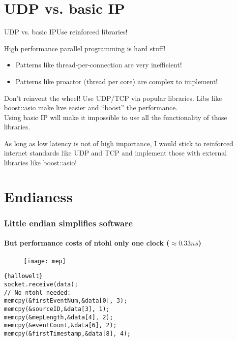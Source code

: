 \section{UDP vs. basic IP}

\begin{frame}{UDP vs. basic IP}{Use reinforced libraries!}
	\begin{alertblock}{High performance parallel programming is hard stuff!}
		\begin{itemize}
		  \item Patterns like thread-per-connection are very inefficient!
		  \item Patterns like proactor (thread per core) are complex to implement!
		\end{itemize}
	\end{alertblock}

	
	\begin{block}{Don't reinvent the wheel! Use UDP/TCP via popular libraries.}
		Libs like boost::asio make live easier and ``boost'' the performance.
		\\
		Using basic IP will make it impossible to use all the functionality of those
		libraries.
	\end{block}
	
	\begin{ergo}
		As long as low latency is not of high importance, I would stick to reinforced
		internet standards like UDP and TCP and implement those with external
		libraries like boost::asio!
	\end{ergo}
\end{frame}

\section{Endianess}

\begin{frame}[fragile]
\frametitle{Little endian simplifies software}
\framesubtitle{But performance costs of ntohl only one clock ($\approx0.33 ns$)}
	\begin{figure}[htp]
		\begin{center}
		  \texttt{[image: mep]}
		\end{center}
	\end{figure}
\begin{lstlisting}[frame=trBL,caption={}]{hallowelt}
socket.receive(data);
// No ntohl needed:
memcpy(&firstEventNum,&data[0], 3);
memcpy(&sourceID,&data[3], 1);
memcpy(&mepLength,&data[4], 2);
memcpy(&eventCount,&data[6], 2);
memcpy(&firstTimestamp,&data[8], 4); 
\end{lstlisting}

\end{frame}


